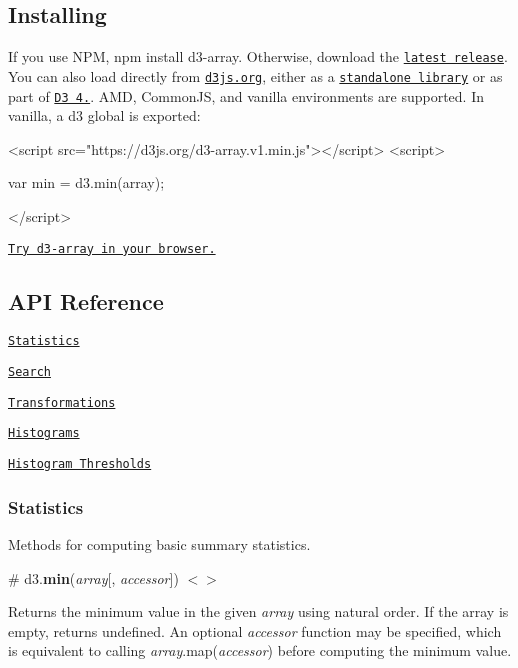 \subsection*{Installing}

If you use N\+PM, {\ttfamily npm install d3-\/array}. Otherwise, download the \href{https://github.com/d3/d3-array/releases/latest}{\tt latest release}. You can also load directly from \href{https://d3js.org}{\tt d3js.\+org}, either as a \href{https://d3js.org/d3-array.v1.min.js}{\tt standalone library} or as part of \href{https://github.com/d3/d3}{\tt D3 4.}. A\+MD, Common\+JS, and vanilla environments are supported. In vanilla, a {\ttfamily d3} global is exported\+:


\begin{DoxyCode}
<script src="https://d3js.org/d3-array.v1.min.js"></script>
<script>

var min = d3.min(array);

</script>
\end{DoxyCode}


\href{https://tonicdev.com/npm/d3-array}{\tt Try d3-\/array in your browser.}

\subsection*{A\+PI Reference}


\begin{DoxyItemize}
\item \href{#statistics}{\tt Statistics}
\item \href{#search}{\tt Search}
\item \href{#transformations}{\tt Transformations}
\item \href{#histograms}{\tt Histograms}
\item \href{#histogram-thresholds}{\tt Histogram Thresholds}
\end{DoxyItemize}

\subsubsection*{Statistics}

Methods for computing basic summary statistics.

\label{_min}%
\# d3.{\bfseries min}({\itshape array}\mbox{[}, {\itshape accessor}\mbox{]}) \href{https://github.com/d3/d3-array/blob/master/src/min.js}{\tt $<$$>$}

Returns the minimum value in the given {\itshape array} using natural order. If the array is empty, returns undefined. An optional {\itshape accessor} function may be specified, which is equivalent to calling {\itshape array}.map({\itshape accessor}) before computing the minimum value.

